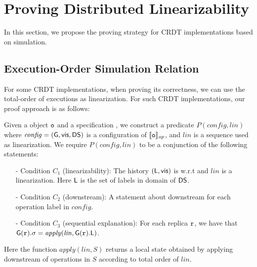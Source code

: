 
\section{Proving Distributed Linearizability}
\label{sec:proving distributed linearizability}

In this section, we propose the proving strategy for CRDT implementations based on simulation.



\subsection{Execution-Order Simulation Relation}
\label{subsec:time order of execution as linearization}


For some CRDT implementations, when proving its correctness, we can use the total-order of executions as linearization. For such CRDT implementations, our proof approach is as follows:


Given a object $\mathtt{o}$ and a specification \Spec{}, we construct a predicate $P(\mathit{config},\mathit{lin})$ where $\mathit{config} = (\mathsf{G}, \mathsf{vis}, \mathsf{DS})$ is a configuration of $\llbracket \mathtt{o} \rrbracket_{\mathit{op}}$, and $\mathit{lin}$ is a sequence used as linearization. We require $P(\mathit{config},\mathit{lin})$ to be a conjunction of the following statements:

\begin{itemize}
\setlength{\itemsep}{0.5pt}
\item[-] Condition $C_1$ (linearizability): The history $(\mathsf{L}, \mathsf{vis})$ is \crdtlinearizable{} w.r.t \Spec{} and $\mathit{lin}$ is a linearization. Here $\mathsf{L}$ is the set of labels in domain of $\mathsf{DS}$.

\item[-] Condition $C_2$ (downstream): A statement about downstream for each operation label in $\mathit{config}$.

\item[-] Condition $C_3$ (sequential explanation): For each replica $\mathtt{r}$, we have that $\mathsf{G}(\mathtt{r}).\sigma = \mathit{apply}(\mathit{lin},\mathsf{G}(\mathtt{r}).\mathsf{L})$.
\end{itemize}

Here the function $\mathit{apply}(\mathit{lin},S)$ returns a local state obtained by applying downstream of operations in $S$ according to total order of $\mathit{lin}$.

